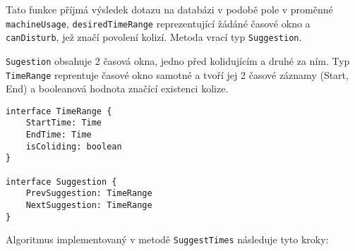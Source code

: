 Tato funkce příjmá výsledek dotazu na databázi v podobě pole v proměnné \texttt{machineUsage}, \texttt{desiredTimeRange} reprezentující žádáné časové okno a \texttt{canDisturb}, jež značí povolení kolizí. Metoda vrací typ \texttt{Suggestion}.

\texttt{Sugestion} obsahuje 2 časová okna, jedno před kolidujícím a druhé za ním. Typ \texttt{TimeRange} reprentuje časové okno samotné a tvoří jej 2 časové záznamy (Start, End) a booleanová hodnota značící existenci kolize.

\begin{lstlisting}
interface TimeRange {
    StartTime: Time
    EndTime: Time
    isColiding: boolean
}

interface Suggestion {
    PrevSuggestion: TimeRange
    NextSuggestion: TimeRange
}
\end{lstlisting}
Algoritmus implementovaný v metodě \texttt{SuggestTimes} následuje tyto kroky:
